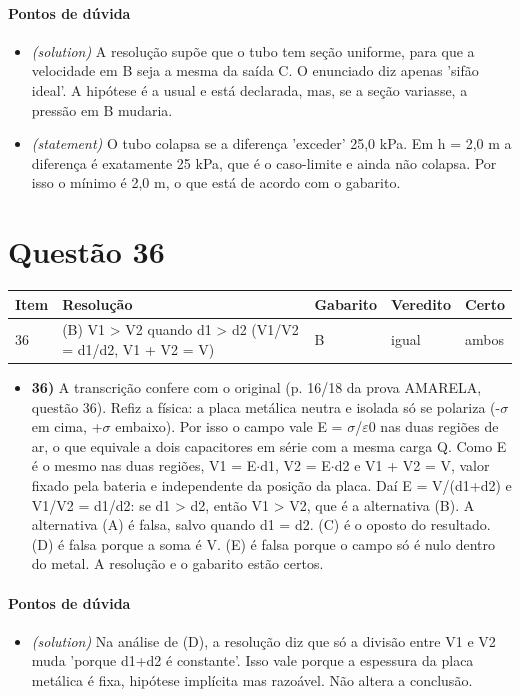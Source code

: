 \documentclass{article}%
\begin{document}
\paragraph{Pontos de dúvida}%
\begin{itemize}%
\item%
\textit{(solution)} A resolução supõe que o tubo tem seção uniforme, para que a velocidade em B seja a mesma da saída C. O enunciado diz apenas 'sifão ideal'. A hipótese é a usual e está declarada, mas, se a seção variasse, a pressão em B mudaria.%
\item%
\textit{(statement)} O tubo colapsa se a diferença 'exceder' 25,0 kPa. Em h = 2,0 m a diferença é exatamente 25 kPa, que é o caso{-}limite e ainda não colapsa. Por isso o mínimo é 2,0 m, o que está de acordo com o gabarito.%
\end{itemize}%
\section*{Questão 36}%
\begin{longtable}{@{}p{} p{} p{} p{} p{}@{}}\toprule Item & Resolução & Gabarito & Veredito & Certo \\ \midrule
36 & (B) V1 > V2 quando d1 > d2 (V1/V2 = d1/d2, V1 + V2 = V) & B & igual & ambos \\
\bottomrule\end{longtable}%
\begin{itemize}%
\item%
\textbf{36)} A transcrição confere com o original (p. 16/18 da prova AMARELA, questão 36). Refiz a física: a placa metálica neutra e isolada só se polariza (-$\sigma$ em cima, +$\sigma$ embaixo). Por isso o campo vale E = $\sigma$/$\varepsilon$0 nas duas regiões de ar, o que equivale a dois capacitores em série com a mesma carga Q. Como E é o mesmo nas duas regiões, V1 = E$\cdot$d1, V2 = E$\cdot$d2 e V1 + V2 = V, valor fixado pela bateria e independente da posição da placa. Daí E = V/(d1+d2) e V1/V2 = d1/d2: se d1 > d2, então V1 > V2, que é a alternativa (B). A alternativa (A) é falsa, salvo quando d1 = d2. (C) é o oposto do resultado. (D) é falsa porque a soma é V. (E) é falsa porque o campo só é nulo dentro do metal. A resolução e o gabarito estão certos.%
\end{itemize}%
\paragraph{Pontos de dúvida}%
\begin{itemize}%
\item%
\textit{(solution)} Na análise de (D), a resolução diz que só a divisão entre V1 e V2 muda 'porque d1+d2 é constante'. Isso vale porque a espessura da placa metálica é fixa, hipótese implícita mas razoável. Não altera a conclusão.%
\end{itemize}%
\end{document}
